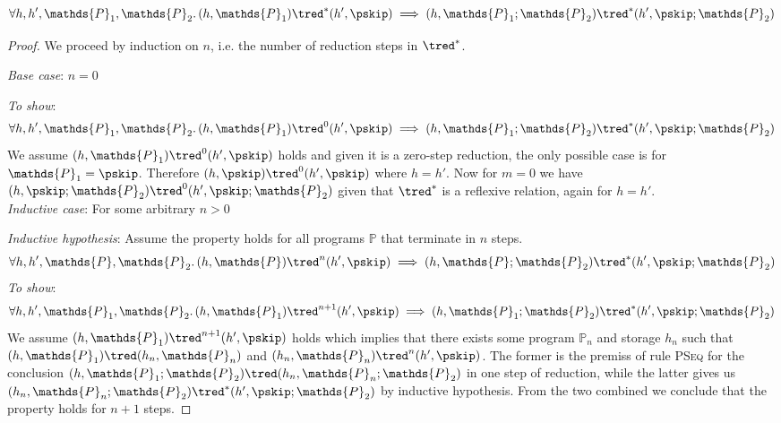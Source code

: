 \begin{lem}
	\label{ref:aseq}
	\[
		\forall h, h', \mathds{P}_1, \mathds{P}_2 \ldotp
		(h, \mathds{P}_1) \tred^* (h', \pskip) \implies 
		(h, \mathds{P}_1; \mathds{P}_2) \tred^* (h', \pskip; \mathds{P}_2)
	\]
	
	{\parindent0pt
	\begin{proof}
	We proceed by induction on $n$, i.e. the number of reduction steps in $\tred^*$.
	
	\indline
	\textit{Base case}: $n = 0$
	
	\textit{To show}: 
	\[
		\forall h, h', \mathds{P}_1, \mathds{P}_2 \ldotp
		(h, \mathds{P}_1) \tred^0 (h', \pskip) \implies 
		(h, \mathds{P}_1; \mathds{P}_2) \tred^* (h', \pskip; \mathds{P}_2)
	\]
	We assume $(h, \mathds{P}_1) \tred^0 (h', \pskip)$ holds and given it is a zero-step reduction, the only possible case is for $\mathds{P}_1 = \pskip$. Therefore $(h, \pskip) \tred^0 (h', \pskip)$ where $h = h'$. Now for $m = 0$ we have $(h, \pskip; \mathds{P}_2) \tred^0 (h', \pskip; \mathds{P}_2)$ given that $\tred^*$ is a reflexive relation, again for $h = h'$. \\
	\indline
	\textit{Inductive case}: For some arbitrary $n > 0$
	
	\textit{Inductive hypothesis}: Assume the property holds for all programs $\mathds{P}$ that terminate in $n$ steps.
	\[
		\forall h, h', \mathds{P}, \mathds{P}_2 \ldotp
		(h, \mathds{P}) \tred^n (h', \pskip) \implies 
		(h, \mathds{P}; \mathds{P}_2) \tred^* (h', \pskip; \mathds{P}_2)
	\]
	\textit{To show}:
	\[
		\forall h, h', \mathds{P}_1, \mathds{P}_2 \ldotp
		(h, \mathds{P}_1) \tred^{n+1} (h', \pskip) \implies 
		(h, \mathds{P}_1; \mathds{P}_2) \tred^* (h', \pskip; \mathds{P}_2)
	\]
	We assume $(h, \mathds{P}_1) \tred^{n+1} (h', \pskip)$ holds which implies that there exists some program $\mathds{P}_n$ and storage $h_n$ such that $(h, \mathds{P}_1) \tred (h_n, \mathds{P}_n)$ and $(h_n, \mathds{P}_n) \tred^n (h', \pskip)$. The former is the premiss of rule \textsc{PSeq} for the conclusion $(h, \mathds{P}_1; \mathds{P}_2) \tred (h_n, \mathds{P}_n; \mathds{P}_2)$ in one step of reduction, while the latter gives us $(h_n, \mathds{P}_n; \mathds{P}_2) \tred^* (h', \pskip ; \mathds{P}_2)$ by inductive hypothesis. From the two combined we conclude that the property holds for $n + 1$ steps.
	\end{proof}
	}
\end{lem}

